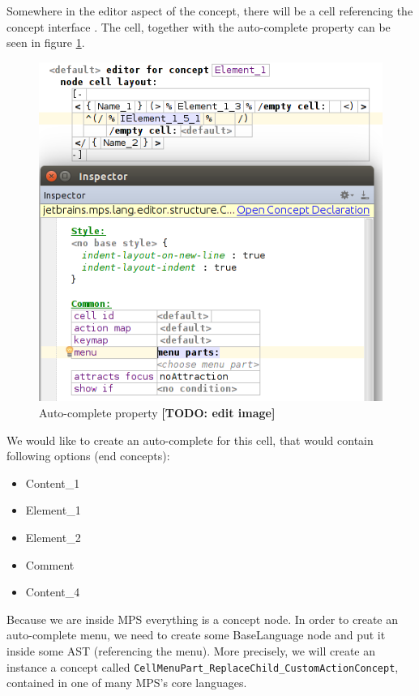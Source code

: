Somewhere in the editor aspect of the  concept, there will be a cell referencing the concept interface .
The cell, together with the auto-complete property can be seen in figure \ref{fig:autocomplete_cell}.

\begin{figure}[h]
	\centering
	\includegraphics[width=\textwidth]{./img/autocomplete_cell.png}
	\caption{Auto-complete property \textbf{[TODO: edit image]}}
	\label{fig:autocomplete_cell}
\end{figure}

We would like to create an auto-complete for this cell, that would contain following options (end concepts):

\begin{itemize}
	\itemsep0em
	\item Content{\_}1
	\item Element{\_}1
	\item Element{\_}2
	\item Comment
	\item Content{\_}4
\end{itemize}

Because we are inside MPS everything is a concept node.
In order to create an auto-complete menu, we need to create some BaseLanguage node and put it inside some AST (referencing the menu).
More precisely, we will create an instance a concept called \texttt{CellMenuPart{\_}ReplaceChild{\_}CustomActionConcept}, contained in one of many MPS's core languages.
\\

